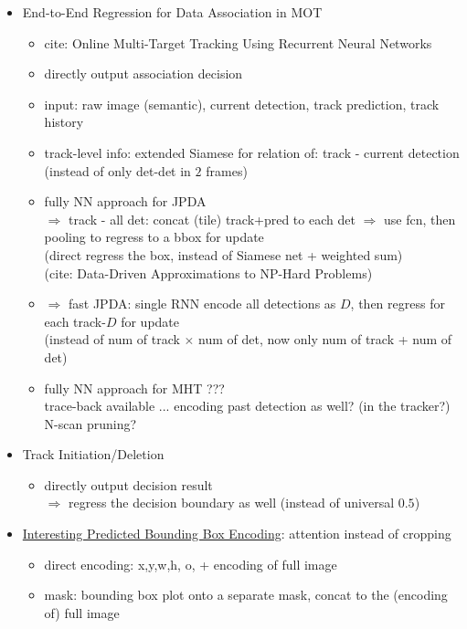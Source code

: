 \begin{itemize}
\begin{itemize}
	\item End-to-End Regression for Data Association in MOT
		\begin{itemize}
		\item cite: Online Multi-Target Tracking Using Recurrent Neural Networks
		\item directly output association decision
		\item input: raw image (semantic), current detection, track prediction, track history
		\item track-level info: extended Siamese for relation of: track - current detection \\
		(instead of only det-det in $2$ frames)
		\item fully NN approach for JPDA \\
		$\Rightarrow$ track - all det: concat (tile) track+pred to each det $\Rightarrow$ use fcn, then pooling to regress to a bbox for update \\
		(direct regress the box, instead of Siamese net + weighted sum) \\
		(cite: Data-Driven Approximations to NP-Hard Problems)
		\item $\Rightarrow$ fast JPDA: single RNN encode all detections as $D$, then regress for each track-$D$ for update \\
		(instead of num of track $\times$ num of det, now only num of track + num of det)
		\item fully NN approach for MHT ??? \\
		trace-back available ... encoding past detection as well? (in the tracker?) \\ 
		N-scan pruning?
		\end{itemize}
	\item Track Initiation/Deletion
		\begin{itemize}
		\item directly output decision result \\
		$\Rightarrow$ regress the decision boundary as well (instead of universal $0.5$)
		\end{itemize}
	\item \underline{Interesting Predicted Bounding Box Encoding}: attention instead of cropping
		\begin{itemize}
		\item direct encoding: x,y,w,h, o, + encoding of full image
		\item mask: bounding box plot onto a separate mask, concat to the (encoding of) full image \\

\end{itemize}
\end{itemize}
\end{itemize}

